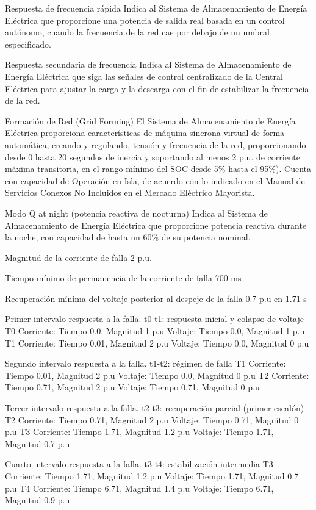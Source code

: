  Respuesta de frecuencia rápida
 Indica al Sistema de Almacenamiento de Energía Eléctrica que proporcione una potencia de salida real basada en un control autónomo, cuando la frecuencia de la red cae por debajo de un umbral especificado.
 
 Respuesta secundaria de frecuencia
 Indica al Sistema de Almacenamiento de Energía Eléctrica que siga las señales de control centralizado de la Central Eléctrica para ajustar la carga y la descarga con el fin de estabilizar la frecuencia de la red.
 
 Formación de Red (Grid Forming)
 El Sistema de Almacenamiento de Energía Eléctrica proporciona características de máquina síncrona virtual de forma automática, creando y regulando, tensión y frecuencia de la red, proporcionando desde 0 hasta 20 segundos de inercia y soportando al menos 2 p.u. de corriente máxima transitoria, en el rango mínimo del SOC desde 5\% hasta el 95\%).
Cuenta con capacidad de Operación en Isla, de acuerdo con lo indicado en el Manual de Servicios Conexos No Incluidos en el Mercado Eléctrico Mayorista. 
 
 Modo Q at night (potencia reactiva de nocturna)
 Indica al Sistema de Almacenamiento de Energía Eléctrica que proporcione potencia reactiva durante la noche, con capacidad de hasta un 60\% de su potencia nominal.
 
 Magnitud de la corriente de falla 
 2 p.u.
 
 Tiempo mínimo de permanencia de la corriente de falla
 700 ms
 
 Recuperación mínima del voltaje posterior al despeje de la falla
 0.7 p.u en 1.71 s
 
 Primer intervalo respuesta a la falla. t0-t1: respuesta inicial y colapso de voltaje
 T0
Corriente: Tiempo 0.0, Magnitud 1 p.u
Voltaje: Tiempo 0.0, Magnitud 1 p.u
T1
Corriente: Tiempo 0.01, Magnitud 2 p.u
Voltaje: Tiempo 0.0, Magnitud 0 p.u
 
 Segundo intervalo respuesta a la falla. t1-t2: régimen de falla
 T1
Corriente: Tiempo 0.01, Magnitud 2 p.u
Voltaje: Tiempo 0.0, Magnitud 0 p.u
T2
Corriente: Tiempo 0.71, Magnitud 2 p.u
Voltaje: Tiempo 0.71, Magnitud 0 p.u
 
 Tercer intervalo respuesta a la falla. t2-t3: recuperación parcial (primer escalón)
 T2
Corriente: Tiempo 0.71, Magnitud 2 p.u
Voltaje: Tiempo 0.71, Magnitud 0 p.u
T3
Corriente: Tiempo 1.71, Magnitud 1.2 p.u
Voltaje: Tiempo 1.71, Magnitud 0.7 p.u
 
 Cuarto intervalo respuesta a la falla. t3-t4: estabilización intermedia
 T3
Corriente: Tiempo 1.71, Magnitud 1.2 p.u
Voltaje: Tiempo 1.71, Magnitud 0.7 p.u
T4
Corriente: Tiempo 6.71, Magnitud 1.4 p.u
Voltaje: Tiempo 6.71, Magnitud 0.9 p.u
 
